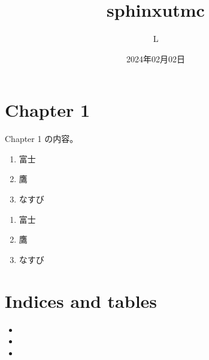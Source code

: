 \documentclass[letterpaper,10pt,dvipdfmx]{sphinxmanual}
\title{sphinx\sphinxhyphen{}utmc}
\date{2024年02月02日}
\author{L}
\begin{document}
\pagestyle{empty}
\sphinxmaketitle
\pagestyle{plain}
\sphinxtableofcontents
\pagestyle{normal}
\label{\detokenize{index::doc}}


\sphinxstepscope


\chapter{Chapter 1}
\label{\detokenize{chap1:chapter-1}}\label{\detokenize{chap1::doc}}
\sphinxAtStartPar
Chapter 1 の内容。
\begin{enumerate}
%
\item {} 
\sphinxAtStartPar
富士

\item {} 
\sphinxAtStartPar
鷹

\item {} 
\sphinxAtStartPar
なすび

\end{enumerate}
\begin{enumerate}
%
\item {} 
\sphinxAtStartPar
富士

\item {} 
\sphinxAtStartPar
鷹

\item {} 
\sphinxAtStartPar
なすび

\end{enumerate}


\chapter{Indices and tables}
\label{\detokenize{index:indices-and-tables}}\begin{itemize}
\item {} 
\sphinxAtStartPar
{}

\item {} 
\sphinxAtStartPar
{}

\item {} 
\sphinxAtStartPar
{}

\end{itemize}



\renewcommand{\indexname}{索引}
\printindex
\end{document}
